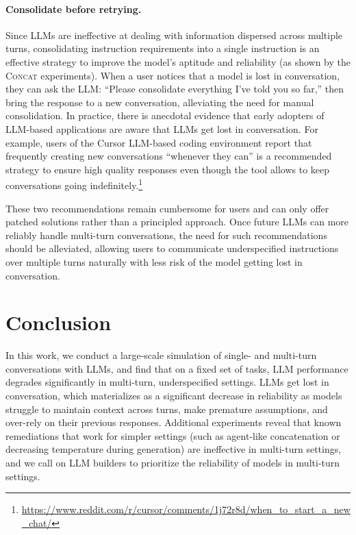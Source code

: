 \documentclass{article}
\newcommand{\concatt}{\textsc{Concat}\xspace}
\begin{document}
\paragraph{Consolidate before retrying.} Since LLMs are ineffective at dealing with information dispersed across multiple turns, consolidating instruction requirements into a single instruction is an effective strategy to improve the model's aptitude and reliability (as shown by the \concatt experiments).
When a user notices that a model is lost in conversation, they can ask the LLM: ``Please consolidate everything I've told you so far,'' then bring the response to a new conversation, alleviating the need for manual consolidation. In practice, there is anecdotal evidence that early adopters of LLM-based applications are aware that LLMs get lost in conversation. For example, users of the Cursor LLM-based coding environment report that frequently creating new conversations ``whenever they can'' is a recommended strategy to ensure high quality responses even though the tool allows to keep conversations going indefinitely.\footnote{\url{https://www.reddit.com/r/cursor/comments/1j72r8d/when_to_start_a_new_chat/}} %

These two recommendations remain cumbersome for users and can only offer patched solutions rather than a principled approach. Once future LLMs can more reliably handle multi-turn conversations, the need for such recommendations should be alleviated, allowing users to communicate underspecified instructions over multiple turns naturally with less risk of the model getting lost in conversation.

\section{Conclusion}\label{sec:conclusion}

In this work, we conduct a large-scale simulation of single- and multi-turn conversations with LLMs, and find that on a fixed set of tasks, LLM performance degrades significantly in multi-turn, underspecified settings. LLMs get lost in conversation, which materializes as a significant decrease in reliability as models struggle to maintain context across turns, make premature assumptions, and over-rely on their previous responses. Additional experiments reveal that known remediations that work for simpler settings (such as agent-like concatenation or decreasing temperature during generation) are ineffective in multi-turn settings, and we call on LLM builders to prioritize the reliability of models in multi-turn settings.
\end{document}
